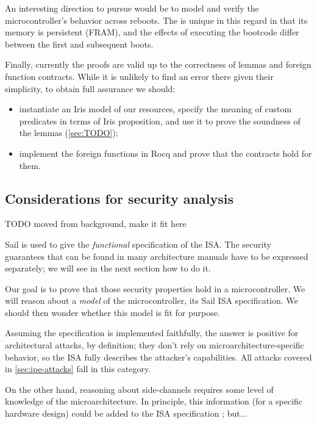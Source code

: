 An interesting direction to pursue would be to model and verify the microcontroller's behavior across reboots. The \msp is unique in this regard in that its memory is persistent (FRAM), and the effects of executing the bootcode differ between the first and subsequent boots.

Finally, currently the proofs are valid up to the correctness of lemmas and foreign function contracts. While it is unlikely to find an error there given their simplicity, to obtain full assurance we should:
\begin{itemize}
\item instantiate an Iris model of our resources, \ie specify the meaning of custom predicates in terms of Iris proposition, and use it to prove the soundness of the lemmas (\cref{sec:TODO});
\item implement the foreign functions in Rocq and prove that the contracts hold for them.
\end{itemize}

\subsection{Considerations for security analysis}

TODO moved from background, make it fit here

Sail is used to give the \emph{functional} specification of the ISA. The security guarantees that can be found in many architecture manuals have to be expressed separately; we will see in the next section how to do it.

Our goal is to prove that those security properties hold in a microcontroller. We will reason about a \emph{model} of the microcontroller, its Sail ISA specification. We should then wonder whether this model is fit for purpose.

Assuming the specification is implemented faithfully, the answer is positive for architectural attacks, by definition; they don't rely on microarchitecture-specific behavior, so the ISA fully describes the attacker's capabilities. All attacks covered in \cref{sec:ipe-attacks} fall in this category.

On the other hand, reasoning about side-channels requires some level of knowledge of the microarchitecture. In principle, this information (for a specific hardware design) could be added to the ISA specification ; but...


